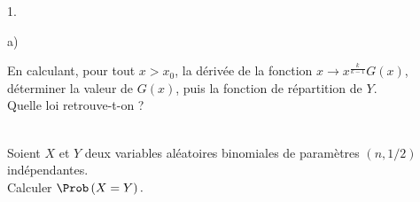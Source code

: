 \documentclass[11pt]{article}%
\begin{document}
\begin{exerciceAP}
\begin{noliste}{1.}
\begin{noliste}{a)}
    \item En calculant, pour tout $x>x_{0}$, la dérivée de la fonction $%
      x\rightarrow x^{\frac{k}{k-1}}G\left( x\right) $, déterminer la valeur
      de $G\left( x\right) $, puis la fonction de répartition de $Y$.\\
      Quelle loi retrouve-t-on ?
    \end{noliste}
  \end{noliste}



\end{exerciceAP}


\begin{exerciceSP}~\\
  Soient $X$ et $Y$ deux variables aléatoires binomiales de paramètres
  $\left( n,1/2\right) $ indépendantes.\\
  Calculer $\Prob\left( X=Y\right) .$
\end{exerciceSP}

\end{document}
